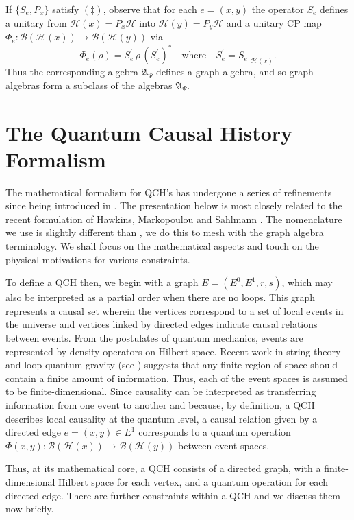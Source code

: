 \documentclass[12pt]{amsart}
\theoremstyle{plain}
\theoremstyle{definition}
\newcommand{\B}{{\mathcal{B}}}
\renewcommand{\H}{{\mathcal{H}}}
\newcommand{\fA}{{\mathfrak{A}}}
\newcommand{\qwhere}{\quad\text{where}\quad}
\begin{document}
If $\{S_e,P_x\}$ satisfy $(\ddagger)$, observe that for each
$e=(x,y)$ the operator $S_e$ defines a unitary from
$\H(x)=P_{x}\H$ into $\H(y)=P_{y}\H$ and a unitary CP map
$\Phi_e:\B(\H(x))\rightarrow\B(\H(y))$ via
\[
\Phi_e(\rho) = S_e^\prime\, \rho\, (S_e^\prime)^* \qwhere
S_e^\prime = S_e|_{\H(x)}.
\]
Thus the corresponding algebra $\fA_\Psi$ defines a graph algebra,
and so graph algebras form a subclass of the algebras $\fA_\Psi$.









\section{The Quantum Causal History Formalism}   \label{S:qch}


The mathematical formalism for QCH's has undergone a series of
refinements since being introduced in \cite{M00B}. The
presentation below is most closely related to the recent
formulation of Hawkins, Markopoulou and Sahlmann \cite{HMS}. The
nomenclature we use is slightly different than \cite{HMS}, we do
this to mesh with the graph algebra terminology. We shall focus on
the mathematical aspects and touch on the physical motivations for
various constraints.

To define a QCH then, we begin with a graph $E=(E^0,E^1,r,s)$,
which may also be interpreted as a partial order when there are no
loops. This graph represents a causal set wherein the vertices
correspond to a set of local events in the universe and vertices
linked by directed edges indicate causal relations between events.
From the postulates of quantum mechanics, events are represented
by density operators on Hilbert space. Recent work in string
theory and loop quantum gravity (see \cite{M02}) suggests that any
finite region of space should contain a finite amount of
information. Thus, each of the event spaces is assumed to be
finite-dimensional. Since causality can be interpreted as
transferring information from one event to another and because, by
definition, a QCH describes local causality at the quantum level,
a causal relation given by a directed edge $e=(x,y)\in E^1$
corresponds to a quantum operation $\Phi(x,y) : \B(\H(x))
\rightarrow \B(\H(y))$ between event spaces.

Thus, at its mathematical core, a QCH consists of a directed
graph, with a finite-dimensional Hilbert space for each vertex,
and a quantum operation for each directed edge. There are further
constraints within a QCH and we discuss them now briefly.
\end{document}
